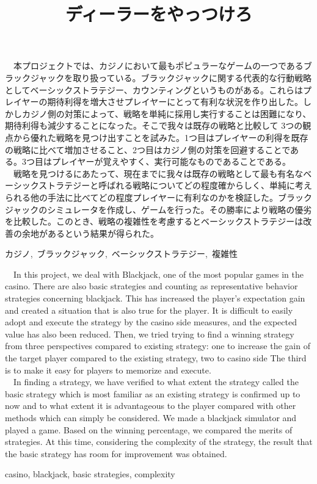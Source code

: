 \documentclass[11pt,a4paper,oneside]{jsbook}
\title{ディーラーをやっつけろ}
\begin{document}
\fontsize{10}{18}\selectfont
\frontmatter

\begin{jabstract} 
\ \ 本プロジェクトでは、カジノにおいて最もポピュラーなゲームの一つであるブラックジャックを取り扱っている。ブラックジャックに関する代表的な行動戦略としてベーシックストラテジー、カウンティングというものがある。これらはプレイヤーの期待利得を増大させプレイヤーにとって有利な状況を作り出した。しかしカジノ側の対策によって、戦略を単純に採用し実行することは困難になり、期待利得も減少することになった。そこで我々は既存の戦略と比較して 3つの観点から優れた戦略を見つけ出すことを試みた。1つ目はプレイヤーの利得を既存の戦略に比べて増加させること、2つ目はカジノ側の対策を回避することである。3つ目はプレイヤーが覚えやすく、実行可能なものであることである。\\
\ \ 戦略を見つけるにあたって、現在までに我々は既存の戦略として最も有名なベーシックストラテジーと呼ばれる戦略についてどの程度確からしく、単純に考えられる他の手法に比べてどの程度プレイヤーに有利なのかを検証した。ブラックジャックのシミュレータを作成し、ゲームを行った。その勝率により戦略の優劣を比較した。このとき、戦略の複雑性を考慮するとベーシックストラテジーは改善の余地があるという結果が得られた。
\begin{jkeyword}
カジノ,\ ブラックジャック,\ ベーシックストラテジー,\ 複雑性
\end{jkeyword}
\end{jabstract}

\begin{eabstract} 
\ \ In this project, we deal with Blackjack, one of the most popular games in the casino. There are also basic strategies and counting as representative behavior strategies concerning blackjack. This has increased the player's expectation gain and created a situation that is also true for the player. It is difficult to easily adopt and execute the strategy by the casino side measures, and the expected value has also been reduced. Then, we tried trying to find a winning strategy from three perspectives compared to existing strategy: one to increase the gain of the target player compared to the existing strategy, two to casino side The third is to make it easy for players to memorize and execute.\\
\ \ In finding a strategy, we have verified to what extent the strategy called the basic strategy which is most familiar as an existing strategy is confirmed up to now and to what extent it is advantageous to the player compared with other methods which can simply be considered. We made a blackjack simulator and played a game. Based on the winning percentage, we compared the merits of strategies. At this time, considering the complexity of the strategy, the result that the basic strategy has room for improvement was obtained.
\begin{ekeyword}
casino, blackjack, basic strategies, complexity
\end{ekeyword}
\end{eabstract}
\end{document}
